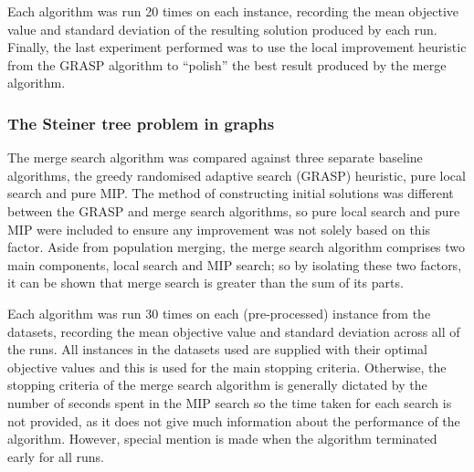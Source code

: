 \documentclass[journal]{IEEEtran}
\begin{document}
Each algorithm was run 20 times on each instance, recording the mean objective value and standard deviation of the resulting solution produced by each run. Finally, the last experiment performed was to use the local improvement heuristic from the GRASP algorithm to ``polish'' the best result produced by the merge algorithm.

\subsubsection*{The Steiner tree problem in graphs}
The merge search algorithm was compared against three separate baseline algorithms, the greedy randomised adaptive search (GRASP) heuristic, pure local search and pure MIP. The method of constructing initial solutions was different between the GRASP and merge search algorithms, so pure local search and pure MIP were included to ensure any improvement was not solely based on this factor. Aside from population merging, the merge search algorithm comprises two main components, local search and MIP search; so by isolating these two factors, it can be shown that merge search is greater than the sum of its parts.

Each algorithm was run 30 times on each (pre-processed) instance from the datasets, recording the mean objective value and standard deviation across all of the runs. All instances in the datasets used are supplied with their optimal objective values and this is used for the main stopping criteria. Otherwise, the stopping criteria of the merge search algorithm is generally dictated by the number of seconds spent in the MIP search so the time taken for each search is not provided, as it does not give much information about the performance of the algorithm. However, special mention is made when the algorithm terminated early for all runs.
\end{document}
